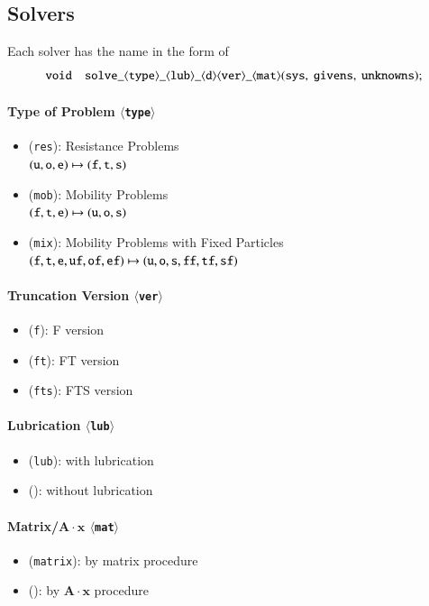 \documentclass{book}
\begin{document}
\subsection{Solvers}
Each solver has the name in the form of
\begin{equation}
  {\tt void\quad solve\_\langle type\rangle\_\langle lub\rangle\_\langle d\rangle\langle ver\rangle\_\langle mat\rangle(sys,\ givens,\ unknowns);}
\end{equation}

\paragraph{Type of Problem $\langle${\tt type}$\rangle$}
\begin{itemize}
\item ({\tt res}): Resistance Problems\\
  $({\tt u, o, e}) \mapsto ({\tt f, t, s})$
\item ({\tt mob}): Mobility Problems\\
  $({\tt f, t, e}) \mapsto ({\tt u, o, s})$
\item ({\tt mix}): Mobility Problems with Fixed Particles\\
  $({\tt f, t, e, uf, of, ef}) \mapsto ({\tt u, o, s, ff, tf, sf})$
\end{itemize}

\paragraph{Truncation Version $\langle${\tt ver}$\rangle$}
\begin{itemize}
\item ({\tt f}): F version
\item ({\tt ft}): FT version
\item ({\tt fts}): FTS version
\end{itemize}

\paragraph{Lubrication $\langle${\tt lub}$\rangle$}
\begin{itemize}
\item ({\tt lub}): with lubrication
\item (): without lubrication
\end{itemize}

\paragraph{Matrix/$\bm{A}\cdot\bm{x}$ $\langle${\tt mat}$\rangle$}
\begin{itemize}
\item ({\tt matrix}): by matrix procedure
\item (): by $\bm{A}\cdot\bm{x}$ procedure
\end{itemize}
\end{document}
